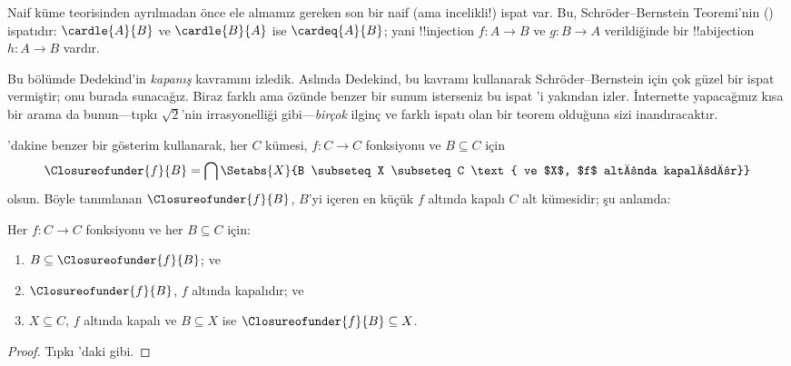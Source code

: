 



Naif küme teorisinden ayrılmadan önce ele almamız gereken son bir naif (ama
incelikli!) ispat var. Bu, Schr\"oder--Bernstein Teoremi'nin
() ispatıdır:
$\cardle{A}{B}$ ve $\cardle{B}{A}$ ise $\cardeq{A}{B}$; yani
!!{injection} $f\colon A\to B$ ve $g\colon B\to A$ verildiğinde bir
!!a{bijection} $h\colon A\to B$ vardır.

Bu bölümde Dedekind'in \emph{kapanış} kavramını izledik. Aslında Dedekind,
bu kavramı kullanarak Schr\"oder--Bernstein için çok güzel bir ispat
vermiştir; onu burada sunacağız. Biraz farklı ama özünde benzer bir sunum
isterseniz bu ispat \citet[pp.~157--8]{Potter2004}'i yakından izler. İnternette
yapacağınız kısa bir arama da bunun---tıpkı $\sqrt{2}$'nin irrasyonelliği
gibi---\emph{birçok} ilginç ve farklı ispatı olan bir teorem olduğuna sizi
inandıracaktır.

'dakine benzer bir gösterim
kullanarak, her $C$ kümesi, $f\colon C\to C$ fonksiyonu ve $B\subseteq C$
için
\[
\Closureofunder{f}{B} = \bigcap \Setabs{X}{B \subseteq X \subseteq C
\text{ ve $X$, $f$ altında kapalıdır}}
\]
olsun. Böyle tanımlanan $\Closureofunder{f}{B}$, $B$'yi içeren en küçük
$f$ altında kapalı $C$ alt kümesidir; şu anlamda:

\begin{lem}
	Her $f\colon C\to C$ fonksiyonu ve her $B\subseteq C$ için:
	\begin{enumerate}
		\item{} $B \subseteq \Closureofunder{f}{B}$; ve
		\item{} $\Closureofunder{f}{B}$, $f$ altında
		kapalıdır; ve
		\item{} $X\subseteq C$, $f$ altında kapalı ve
		$B\subseteq X$ ise $\Closureofunder{f}{B}\subseteq X$.
	\end{enumerate}
\end{lem}

\begin{proof}
Tıpkı 'daki gibi.
\end{proof}

